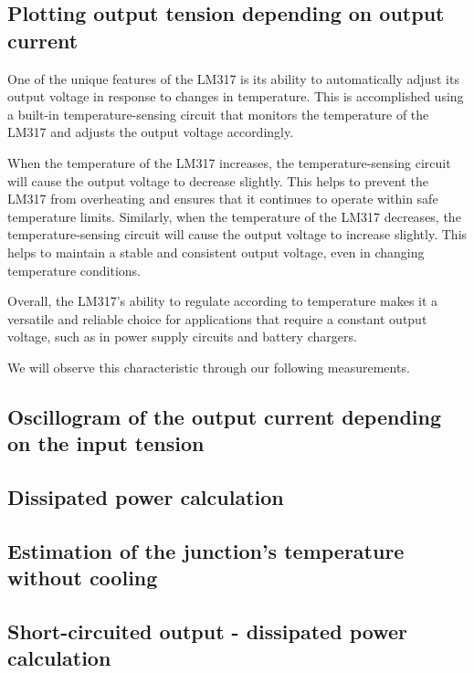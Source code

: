 \subsection{Plotting output tension depending on output current} \label{ssec:num12}
{
One of the unique features of the LM317 is its ability to automatically adjust its output voltage in response to changes in temperature. This is accomplished using a built-in temperature-sensing circuit that monitors the temperature of the LM317 and adjusts the output voltage accordingly.\vspace{+12pt}

When the temperature of the LM317 increases, the temperature-sensing circuit will cause the output voltage to decrease slightly. This helps to prevent the LM317 from overheating and ensures that it continues to operate within safe temperature limits. Similarly, when the temperature of the LM317 decreases, the temperature-sensing circuit will cause the output voltage to increase slightly. This helps to maintain a stable and consistent output voltage, even in changing temperature conditions.\vspace{+12pt}

Overall, the LM317's ability to regulate according to temperature makes it a versatile and reliable choice for applications that require a constant output voltage, such as in power supply circuits and battery chargers. \vspace{+12pt}

We will observe this characteristic through our following measurements.
}
\subsection{Oscillogram of the output current depending on the input tension} \label{ssec:num13}
{}
\subsection{Dissipated power calculation} \label{ssec:num14}
{}
\subsection{Estimation of the junction's temperature without cooling} \label{ssec:num15}
{}
\subsection{Short-circuited output - dissipated power calculation} \label{ssec:num16}
{}
\clearpage
